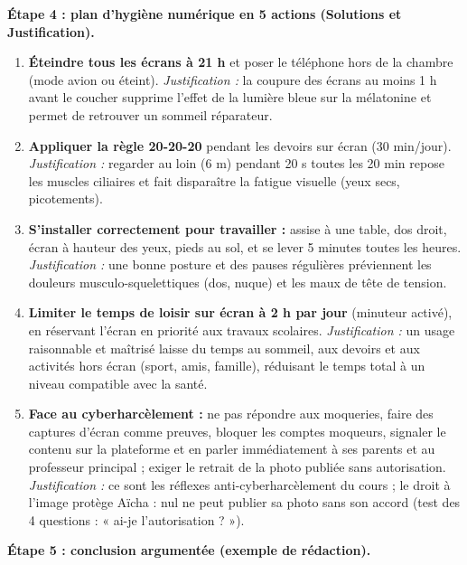 \documentclass[11pt]{article}
\begin{document}
\begin{exoresolu}
\textbf{Étape 4 : plan d'hygiène numérique en 5 actions (Solutions et Justification).}

\begin{enumerate}
\item \textbf{Éteindre tous les écrans à 21 h} et poser le téléphone hors de la chambre (mode avion ou éteint). \emph{Justification :} la coupure des écrans au moins 1 h avant le coucher supprime l'effet de la lumière bleue sur la mélatonine et permet de retrouver un sommeil réparateur.
\item \textbf{Appliquer la règle 20-20-20} pendant les devoirs sur écran (30 min/jour). \emph{Justification :} regarder au loin (6 m) pendant 20 s toutes les 20 min repose les muscles ciliaires et fait disparaître la fatigue visuelle (yeux secs, picotements).
\item \textbf{S'installer correctement pour travailler :} assise à une table, dos droit, écran à hauteur des yeux, pieds au sol, et se lever 5 minutes toutes les heures. \emph{Justification :} une bonne posture et des pauses régulières préviennent les douleurs musculo-squelettiques (dos, nuque) et les maux de tête de tension.
\item \textbf{Limiter le temps de loisir sur écran à 2 h par jour} (minuteur activé), en réservant l'écran en priorité aux travaux scolaires. \emph{Justification :} un usage raisonnable et maîtrisé laisse du temps au sommeil, aux devoirs et aux activités hors écran (sport, amis, famille), réduisant le temps total à un niveau compatible avec la santé.
\item \textbf{Face au cyberharcèlement :} ne pas répondre aux moqueries, faire des captures d'écran comme preuves, bloquer les comptes moqueurs, signaler le contenu sur la plateforme et en parler immédiatement à ses parents et au professeur principal ; exiger le retrait de la photo publiée sans autorisation. \emph{Justification :} ce sont les réflexes anti-cyberharcèlement du cours ; le droit à l'image protège Aïcha : nul ne peut publier sa photo sans son accord (test des 4 questions : « ai-je l'autorisation ? »).
\end{enumerate}

\textbf{Étape 5 : conclusion argumentée (exemple de rédaction).}


\end{exoresolu}
\end{document}
